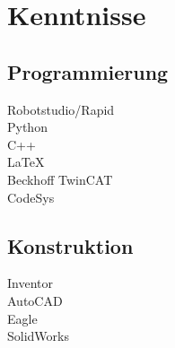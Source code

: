 \documentclass[]{plushcv}
\begin{document}
		\hfill
		\begin{minipage}[t]{0.25\textwidth} 
			
			\section{\color{primary}Kenntnisse}
			\subsection{\color{primary}Programmierung}
			\sectionsep
			\textbullet{}Robotstudio/Rapid \\\textbullet{}Python\\ \textbullet{}C++ \\\textbullet{}\LaTeX \\ \textbullet{}Beckhoff TwinCAT\\
			\textbullet{}CodeSys
			\sectionsep
			
			\subsection{\color{primary}Konstruktion}
			\sectionsep
			\textbullet{}Inventor \\ \textbullet{}AutoCAD \\ \textbullet{}Eagle \\ \textbullet{}SolidWorks \\
			\sectionsep
			
		\end{minipage} 
		
		\vspace{0.5cm} %
		
		
\end{document}
